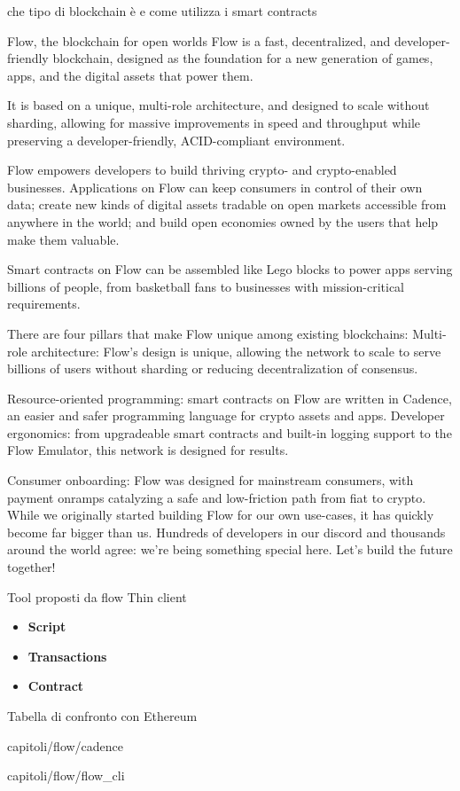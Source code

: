 che tipo di blockchain è e come utilizza i smart contracts

Flow, the blockchain for open worlds 
Flow is a fast, decentralized, and developer-friendly blockchain, designed as the foundation for a new generation of games, apps, and the digital assets that power them. 

It is based on a unique, multi-role architecture, and designed to scale without sharding, allowing for massive improvements in speed and throughput while preserving a developer-friendly, ACID-compliant environment.

Flow empowers developers to build thriving crypto- and crypto-enabled businesses. Applications on Flow can keep consumers in control of their own data; create new kinds of digital assets tradable on open markets accessible from anywhere in the world; and build open economies owned by the users that help make them valuable. 

Smart contracts on Flow can be assembled like Lego blocks to power apps serving billions of people, from basketball fans to businesses with mission-critical requirements.

There are four pillars that make Flow unique among existing blockchains: Multi-role architecture: Flow’s design is unique, allowing the network to scale to serve billions of users without sharding or reducing decentralization of consensus.

Resource-oriented programming: smart contracts on Flow are written in Cadence, an easier and safer programming language for crypto assets and apps. Developer ergonomics: from upgradeable smart contracts and built-in logging support to the Flow Emulator, this network is designed for results. 

Consumer onboarding: Flow was designed for mainstream consumers, with payment onramps catalyzing a safe and low-friction path from fiat to crypto.
While we originally started building Flow for our own use-cases, it has quickly become far bigger than us. Hundreds of developers in our discord and thousands around the world agree: we’re being something special here. Let’s build the future together!

Tool proposti da flow
Thin client

\begin{itemize}
    \item[] \textbf{Script}
    \item[] \textbf{Transactions}
    \item[] \textbf{Contract}
\end{itemize}

Tabella di confronto con Ethereum


{capitoli/flow/cadence}

{capitoli/flow/flow_cli}